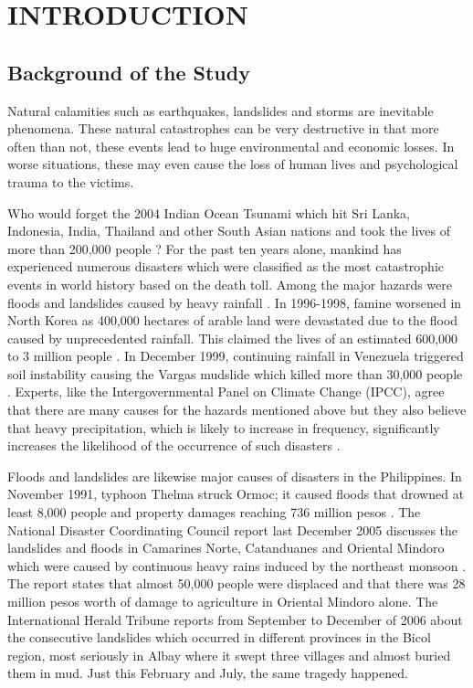 \chapter{INTRODUCTION}

\section{Background of the Study}

Natural calamities such as earthquakes, landslides and storms are inevitable phenomena. These natural catastrophes can be very destructive in that more often than not, these events lead to huge environmental and economic losses. In worse situations, these may even cause the loss of human lives and psychological trauma to the victims.

\bigskip
Who would forget the 2004 Indian Ocean Tsunami which hit Sri Lanka, Indonesia, India, Thailand and other South Asian nations and took the lives of more than 200,000 people \cite{cnn}? For the past ten years alone, mankind has experienced numerous disasters which were classified as the most catastrophic events in world history based on the death toll. Among the major hazards were floods and landslides caused by heavy rainfall \cite{un}. In 1996-1998, famine worsened in North Korea as 400,000 hectares of arable land were devastated due to the flood caused by unprecedented rainfall. This claimed the lives of an estimated 600,000 to 3 million people \cite{nytimes}. In December 1999, continuing rainfall in Venezuela triggered soil instability causing the Vargas mudslide which killed more than 30,000 people \cite{nytimes}. Experts, like the Intergovernmental Panel on Climate Change (IPCC), agree that there are many causes for the hazards mentioned above but they also believe that heavy precipitation, which is likely to increase in frequency, significantly increases the likelihood of the occurrence of such disasters \cite{ipcc}.

\bigskip
Floods and landslides are likewise major causes of disasters in the Philippines. In November 1991, typhoon Thelma struck Ormoc; it caused floods that drowned at least 8,000 people and property damages reaching 736 million pesos \cite{cdrc}. The National Disaster Coordinating Council report last December 2005 discusses the landslides and floods in Camarines Norte, Catanduanes and Oriental Mindoro which were caused by continuous heavy rains induced by the northeast monsoon \cite{ndccReport}. The report states that almost 50,000 people were displaced and that there was 28 million pesos worth of damage to agriculture in Oriental Mindoro alone. The International Herald Tribune reports from September to December of 2006 about the consecutive landslides which occurred in different provinces in the Bicol region, most seriously in Albay where it swept three villages and almost buried them in mud. Just this February and July, the same tragedy happened.

